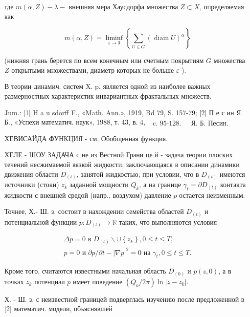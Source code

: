 \documentclass[10pt]{article}
\begin{document}
где $m(\alpha, Z)-\lambda-$ внешняя мера Хаусдорфа множества $Z \subset X$, определяемая как



\[

m(\alpha, Z)=\liminf _{\varepsilon \rightarrow 0}\left\{\sum_{U \in G}(\operatorname{diam} U)^{\alpha}\right\}

\]



(нижняя грань берется по всем конечным или счетным покрытиям $G$ множества $Z$ открытыми множествами, диаметр которых не больше $\varepsilon$ ).



В теории динамич. систем X. p. является одной из наиболее важных размерностных характеристик инвариантных фрактальных множеств.



Jum.: [1] H a u sdorff F., «Math. Ann.», 1919, Bd 79, S. 157-79; [2] П е с ин Я. Б., «Успехи математич. наук», 1988, т. 43, в. 4, $\begin{array}{ll}\text { c. 95-128. } & \text { Я. Б. Песин. }\end{array}$



ХЕВИСАЙДА ФУНКЦИЯ - см. Обобщенная функция.



ХЕЛЕ - ШОУ ЗАДАЧА с не из Вестной Грани це й - задача теории плоских течений несжимаемой вязкой жидкости, заключающаяся в описании динамики движения области $D_{(t)}$, занятой жидкостью, при условии, что в $D_{(t)}$ имеются источники (стоки) $z_{k}$ заданной мощности $Q_{k}$, а на границе $\gamma_{t}=\partial D_{(t)}$ контакта жидкости с внешней средой (напр., воздухом) давление $p$ остается неизменным.



Точнее, Х.- Ш. з. состоит в нахождении семейства областей $D_{(t)}$ и потенциальной функции $p: D_{(t)} \rightarrow \mathbb{R}$ таких, что выполняются условия



\[

\begin{gathered}

\Delta p=0 \text { в } D_{(t)} \backslash \cup\left\{z_{k}\right\}, 0 \leqslant t \leqslant T, \\

p=0 \text { и } \partial p / \partial t-|\nabla p|^{2}=0 \text { на } \gamma_{t}, 0 \leqslant t \leqslant T .

\end{gathered}

\]



Кроме того, считаются известными начальная область $D_{(0)}$ и $p(z, 0)$, а в точках $z_{k}$ потенциал $p$ имеет поведение $\left(Q_{k} / 2 \pi\right) \ln \left|z-z_{k}\right|$.



Х. - Ш. з. с неизвестной границей подверглась изучению после предложенной в [2] математич. модели, объяснявшей
\end{document}
